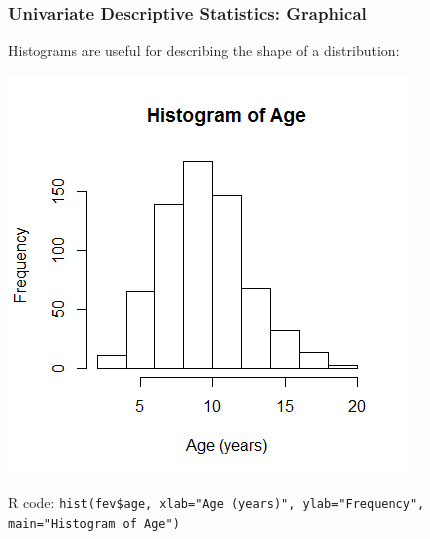 \documentclass[12pt, 
hyperref={colorlinks=true, linkcolor=blue, urlcolor=cyan}]{beamer}
\begin{document}
\begin{frame}
\frametitle{Univariate Descriptive Statistics: Graphical}

Histograms are useful for describing the shape of a distribution:\vspace{-0.8cm}

\center \includegraphics[height=0.7\textheight]{./histogram-age}

\vspace{-0.5cm} \begin{scriptsize} R code:  \texttt{hist(fev\$age, xlab="Age (years)", ylab="Frequency", main="Histogram of Age")} \end{scriptsize}

\end{frame}
\end{document}

